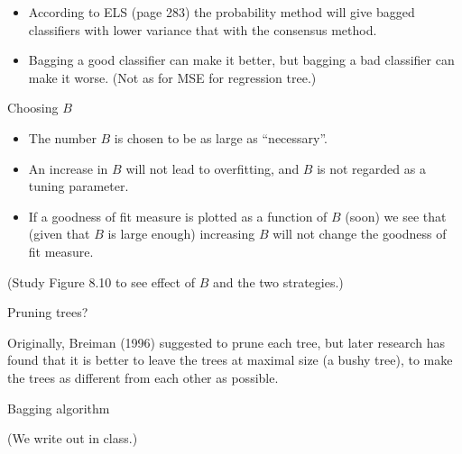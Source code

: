 \documentclass[
  ignorenonframetext,
]{beamer}
\providecommand{\tightlist}{%
  \setlength{\itemsep}{0pt}\setlength{\parskip}{0pt}}
\begin{document}
\begin{frame}

\begin{itemize}
\item
  According to ELS (page 283) the probability method will give bagged
  classifiers with lower variance that with the consensus method.
\item
  Bagging a good classifier can make it better, but bagging a bad
  classifier can make it worse. (Not as for MSE for regression tree.)
\end{itemize}

\begin{block}{Choosing \(B\)}

\begin{itemize}
\tightlist
\item
  The number \(B\) is chosen to be as large as ``necessary''.
\item
  An increase in \(B\) will not lead to overfitting, and \(B\) is not
  regarded as a tuning parameter.
\item
  If a goodness of fit measure is plotted as a function of \(B\) (soon)
  we see that (given that \(B\) is large enough) increasing \(B\) will
  not change the goodness of fit measure.
\end{itemize}

(Study Figure 8.10 to see effect of \(B\) and the two strategies.)

\end{block}

\end{frame}

\begin{frame}

\begin{block}{Pruning trees?}

Originally, Breiman (1996) suggested to prune each tree, but later
research has found that it is better to leave the trees at maximal size
(a bushy tree), to make the trees as different from each other as
possible.

\end{block}

\end{frame}

\begin{frame}

\begin{block}{Bagging algorithm}

(We write out in class.)

\end{block}

\end{frame}
\end{document}
